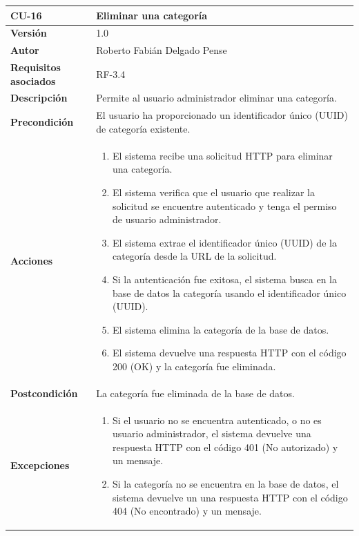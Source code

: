 \begin{table}[p]
	\centering
	\begin{tabularx}{\linewidth}{ p{} p{} }
		\toprule
		\textbf{CU-16}    & \textbf{Eliminar una categoría}\\
		\toprule
		\textbf{Versión}              & 1.0    \\
		\textbf{Autor}                & Roberto Fabián Delgado Pense \\
		\textbf{Requisitos asociados} & RF-3.4 \\ 
		\textbf{Descripción}          & Permite al usuario administrador eliminar una categoría. \\
		\textbf{Precondición}         & El usuario ha proporcionado un identificador único (UUID) de categoría existente.\\
		\textbf{Acciones}             &
		\begin{enumerate}
			\def\labelenumi{\arabic{enumi}.}
			\tightlist
			\item El sistema recibe una solicitud HTTP para eliminar una categoría.
                   \item El sistema verifica que el usuario que realizar la solicitud se encuentre autenticado y tenga el permiso de usuario administrador.
			\item El sistema extrae el identificador único (UUID) de la categoría desde la URL de la solicitud.
                \item Si la autenticación fue exitosa, el sistema busca en la base de datos la categoría usando el identificador único (UUID).
                \item El sistema elimina la categoría de la base de datos.
                \item El sistema devuelve una respuesta HTTP con el código 200 (OK) y la categoría fue eliminada.
            \end{enumerate}\\
		\textbf{Postcondición}        & La categoría fue eliminada de la base de datos.\\
		\textbf{Excepciones}          & 
            \begin{enumerate}
			\def\labelenumi{\arabic{enumi}.}
			\tightlist
   			\item Si el usuario no se encuentra autenticado, o no es usuario administrador, el sistema devuelve una                 respuesta HTTP con el código 401 (No autorizado) y un mensaje.
                \item   Si la categoría no se encuentra en la base de datos, el sistema devuelve un                           una respuesta HTTP con el código 404 (No encontrado) y un mensaje. 

\end{enumerate}
\end{tabularx}
\end{table}
